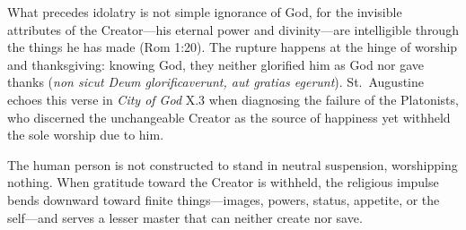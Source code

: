 What precedes idolatry is not simple ignorance of God, for the invisible attributes of the Creator---his eternal power and divinity---are intelligible through the things he has made (Rom 1:20). The rupture happens at the hinge of worship and thanksgiving: knowing God, they neither glorified him as God nor gave thanks (\emph{non sicut Deum glorificaverunt, aut gratias egerunt}). St.\ Augustine echoes this verse in \emph{City of God} X.3 when diagnosing the failure of the Platonists, who discerned the unchangeable Creator as the source of happiness yet withheld the sole worship due to him.

The human person is not constructed to stand in neutral suspension, worshipping nothing. When gratitude toward the Creator is withheld, the religious impulse bends downward toward finite things---images, powers, status, appetite, or the self---and serves a lesser master that can neither create nor save.
